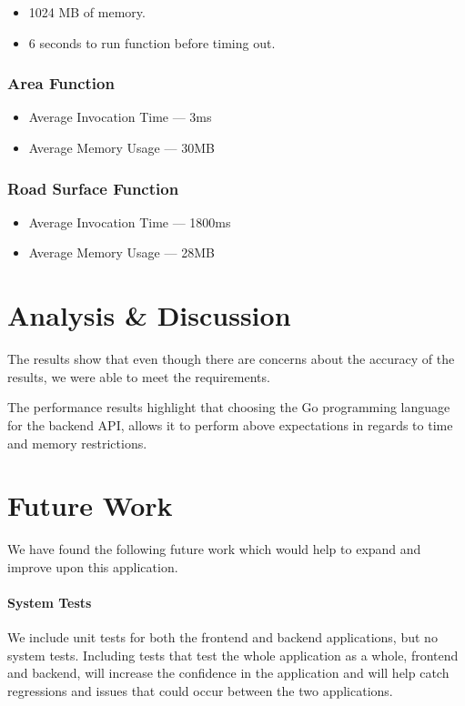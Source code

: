 \documentclass[a4paper,11pt]{article}
\begin{document}
\begin{itemize}
  \item 1024 MB of memory.
  \item 6 seconds to run function before timing out.
\end{itemize}

\subsubsection{Area Function}

\begin{itemize}
  \item Average Invocation Time --- 3ms
  \item Average Memory Usage --- 30MB
\end{itemize}

\subsubsection{Road Surface Function}

\begin{itemize}
  \item Average Invocation Time --- 1800ms
  \item Average Memory Usage --- 28MB
\end{itemize}

\section{Analysis \& Discussion}


The results show that even though there are concerns about the accuracy of the
results, we were able to meet the requirements.

The performance results highlight that choosing the Go programming language
for the backend API, allows it to perform above expectations in regards to
time and memory restrictions.


\section{Future Work}

We have found the following future work which would help to expand and improve
upon this application.

\paragraph{System Tests} We include unit tests for both the frontend and backend
applications, but no system tests. Including tests that test the whole
application as a whole, frontend and backend, will increase the confidence in
the application and will help catch regressions and issues that could occur
between the two applications.
\end{document}
